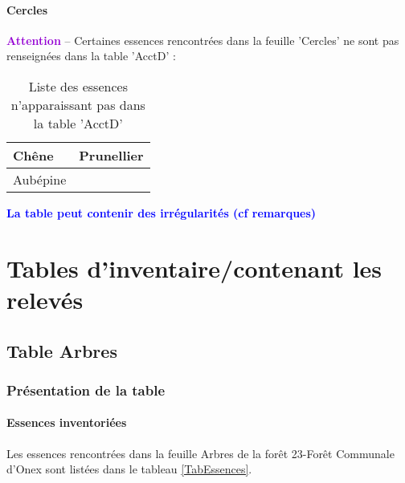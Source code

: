 \documentclass[a4paper]{article}
\begin{document}
        \paragraph{Cercles}\textcolor{DarkViolet}{\textbf{Attention}} -- Certaines essences rencontrées dans la feuille 'Cercles' ne sont pas renseignées dans la table 'AcctD' :\\%
\begin{table}[ht]
\centering
\begingroup\scriptsize
\begin{tabular}{|M{1.5cm}|M{1.5cm}|}
   \hline
Chêne & Prunellier \\ 
   \hline
Aubépine &  \\ 
   \hline
\end{tabular}
\endgroup
\caption{\footnotesize{Liste des essences n'apparaissant pas dans la table 'AcctD'}} 
\label{TabEssCercles_AcctD}
\end{table}
\FloatBarrier
        \begin{center}
                    \textcolor{blue}{\textbf{La table peut contenir des irrégularités (cf remarques)}}
                    \end{center}
                    
\FloatBarrier
\clearpage

\section{Tables d'inventaire/contenant les relevés}
\subsection{Table Arbres}
\subsubsection{Présentation de la table}
\paragraph{Essences inventoriées}
Les essences rencontrées dans la feuille Arbres de la forêt 23-Forêt Communale d'Onex sont listées dans le tableau \ref{TabEssences}.\\
\end{document}
